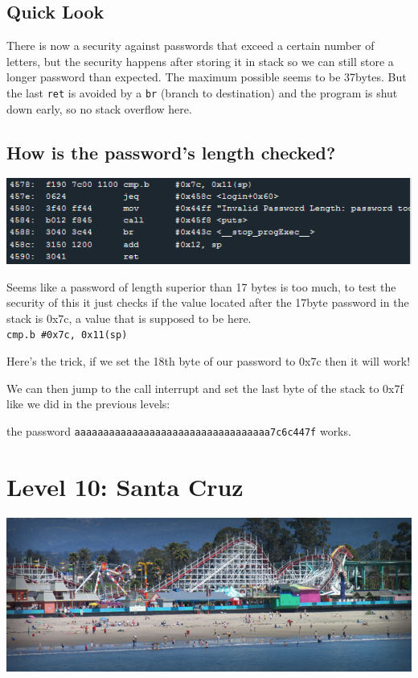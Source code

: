 \documentclass[a4paper,11pt]{article}
\begin{document}
\subsection{Quick Look}\label{quick-look}

There is now a security against passwords that exceed a certain number
of letters, but the security happens after storing it in stack so we can
still store a longer password than expected. The maximum possible seems
to be 37bytes. But the last \texttt{ret} is avoided by a \texttt{br}
(branch to destination) and the program is shut down early, so no stack
overflow here.

\subsection{How is the password's length
checked?}\label{how-is-the-passwords-length-checked}

\includegraphics{img/9_1.PNG}

Seems like a password of length superior than 17 bytes is too much, to
test the security of this it just checks if the value located after the
17byte password in the stack is 0x7c, a value that is supposed to be
here.\\\texttt{cmp.b   \#0x7c, 0x11(sp)}

Here's the trick, if we set the 18th byte of our password to 0x7c then
it will work!

We can then jump to the call interrupt and set the last byte of the
stack to 0x7f like we did in the previous levels:

the password \texttt{aaaaaaaaaaaaaaaaaaaaaaaaaaaaaaaaaa7c6c447f} works.

\section{Level 10: Santa Cruz}\label{level-10-santa-cruz}

\includegraphics{img/10_5.PNG}
\end{document}
